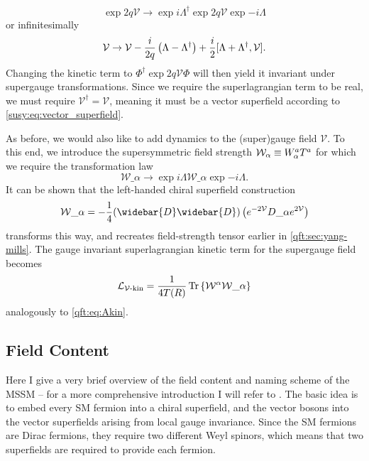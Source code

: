 \documentclass[../main.tex]{subfiles}
\begin{document}
\begin{equation}
  \exp{2q\mathcal{V}} \to \exp{i\Lambda^\dagger} \exp{2q\mathcal{V}} \exp{-i\Lambda}
\end{equation}
or infinitesimally
\begin{equation}
  \mathcal{V} \to \mathcal{V} - \frac{i}{2q} \left(\Lambda - \Lambda^\dagger\right) + \frac{i}{2} [\Lambda + \Lambda^\dagger,\mathcal{V}].
\end{equation}
Changing the kinetic term to \(\Phi^\dagger \exp{2q\mathcal{V}} \Phi\) will then yield it invariant under supergauge transformations.
Since we require the superlagrangian term to be real, we must require \(\mathcal{V}^\dagger = \mathcal{V}\), meaning it must be a vector superfield according to \cref{susy:eq:vector_superfield}.

As before, we would also like to add dynamics to the (super)gauge field \(\mathcal{V}\).
To this end, we introduce the supersymmetric field strength \(\mathcal{W}_\alpha \equiv W\indices*{^a_\alpha} T^a\) for which we require the transformation law
\begin{equation}
  \mathcal{W}\_\alpha \to \exp{i\Lambda} \mathcal{W}\_\alpha \exp{-i\Lambda}.
\end{equation}
It can be shown that the left-handed chiral superfield construction
\begin{equation}
  \label{susy:eq:superfield_strength}
  \mathcal{W}\_\alpha = -\frac{1}{4} (\widebar{D}\widebar{D}) \pclosed{\exp{-2\mathcal{V}} D\_\alpha \exp{2\mathcal{V}}}
\end{equation}
transforms this way, and recreates field-strength tensor earlier in \cref{qft:sec:yang-mills}.\cite{Martin:1997ns}
The gauge invariant superlagrangian kinetic term for the supergauge field becomes
\begin{equation}
  \label{susy:eq:Vkin}
  \L_{\mathcal{V}\text{-kin}} = \frac{1}{4 T(R)} \tr\cclosed{ \mathcal{W}\^\alpha \mathcal{W}\_\alpha }
\end{equation}
analogously to \cref{qft:eq:Akin}.
\\



\subsection{Field Content}
Here I give a very brief overview of the field content and naming scheme of the MSSM -- for a more comprehensive introduction I will refer to \needcite.
The basic idea is to embed every SM fermion into a chiral superfield, and the vector bosons into the vector superfields arising from local gauge invariance.
Since the SM fermions are Dirac fermions, they require two different Weyl spinors, which means that two superfields are required to provide each fermion.
\end{document}
